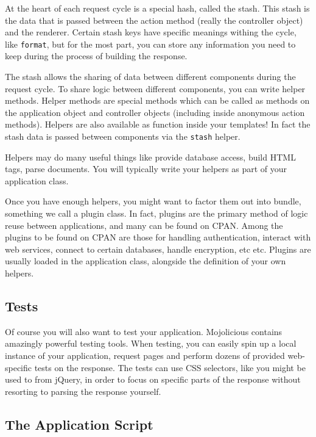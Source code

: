 At the heart of each request cycle is a special hash, called the stash.
This stash is the data that is passed between the action method (really the controller object) and the renderer.
Certain stash keys have specific meanings withing the cycle, like \verb!format!, but for the most part, you can store any information you need to keep during the process of building the response.

The stash allows the sharing of data between different components during the request cycle.
To share logic between different components, you can write helper methods.
Helper methods are special methods which can be called as methods on the application object and controller objects (including inside anonymous action methods).
Helpers are also available as function inside your templates!
In fact the stash data is passed between components via the \verb!stash! helper.

Helpers may do many useful things like provide database access, build HTML tags, parse documents.
You will typically write your helpers as part of your application class.

Once you have enough helpers, you might want to factor them out into bundle, something we call a plugin class.
In fact, plugins are the primary method of logic reuse between applications, and many can be found on CPAN.
Among the plugins to be found on CPAN are those for handling authentication, interact with web services, connect to certain databases, handle encryption, etc etc.
Plugins are usually loaded in the application class, alongside the definition of your own helpers.

\subsection{Tests}

Of course you will also want to test your application.
Mojolicious contains amazingly powerful testing tools.
When testing, you can easily spin up a local instance of your application, request pages and perform dozens of provided web-specific tests on the response.
The tests can use CSS selectors, like you might be used to from jQuery, in order to focus on specific parts of the response without resorting to parsing the response yourself.

\subsection{The Application Script}

